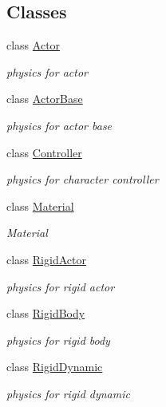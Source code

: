 \subsection*{Classes}
\begin{DoxyCompactItemize}
\item 
class \hyperlink{classContent_1_1Actor_1_1Physics_1_1Actor}{Actor}
\begin{DoxyCompactList}\small\item\em physics for actor \item\end{DoxyCompactList}\item 
class \hyperlink{classContent_1_1Actor_1_1Physics_1_1ActorBase}{ActorBase}
\begin{DoxyCompactList}\small\item\em physics for actor base \item\end{DoxyCompactList}\item 
class \hyperlink{classContent_1_1Actor_1_1Physics_1_1Controller}{Controller}
\begin{DoxyCompactList}\small\item\em physics for character controller \item\end{DoxyCompactList}\item 
class \hyperlink{classContent_1_1Actor_1_1Physics_1_1Material}{Material}
\begin{DoxyCompactList}\small\item\em Material \item\end{DoxyCompactList}\item 
class \hyperlink{classContent_1_1Actor_1_1Physics_1_1RigidActor}{RigidActor}
\begin{DoxyCompactList}\small\item\em physics for rigid actor \item\end{DoxyCompactList}\item 
class \hyperlink{classContent_1_1Actor_1_1Physics_1_1RigidBody}{RigidBody}
\begin{DoxyCompactList}\small\item\em physics for rigid body \item\end{DoxyCompactList}\item 
class \hyperlink{classContent_1_1Actor_1_1Physics_1_1RigidDynamic}{RigidDynamic}
\begin{DoxyCompactList}\small\item\em physics for rigid dynamic \item\end{DoxyCompactList}\item 

\end{DoxyCompactItemize}
